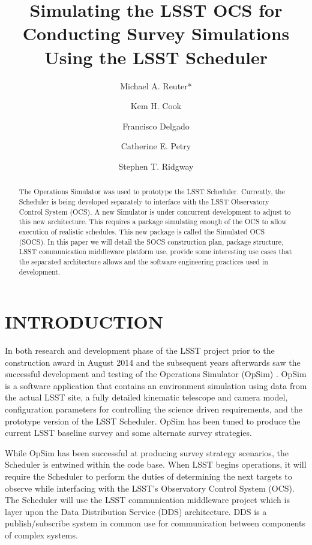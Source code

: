 \documentclass[]{spie}  %
\title{Simulating the LSST OCS for Conducting Survey Simulations Using the LSST Scheduler}
\author[a]{Michael A. Reuter*}
\author[b]{Kem H. Cook}
\author[a]{Francisco Delgado}
\author[a]{Catherine E. Petry}
\author[c]{Stephen T. Ridgway}
\affil[a]{LSST, 950 N Cherry Ave, Tucson, AZ USA}
\affil[b]{Cook Astronomical Consulting, San Ramon, CA USA}
\affil[c]{National Optical Astronomy Observatory, 950 N Cherry Ave, Tucson, AZ USA}
\begin{document}
 
\maketitle

\begin{abstract}
The Operations Simulator was used to prototype the LSST Scheduler. Currently, the Scheduler is being developed separately to interface with the LSST Observatory Control System (OCS). A new Simulator is under concurrent development to adjust to this new architecture. This requires a package simulating enough of the OCS to allow execution of realistic schedules. This new package is called the Simulated OCS (SOCS). In this paper we will detail the SOCS construction plan, package structure, LSST communication middleware platform use, provide some interesting use cases that the separated architecture allows and the software engineering practices used in development.
\end{abstract}


\section{INTRODUCTION}
\label{sec:intro}  %

In both research and development phase of the LSST project prior to the construction award in August 2014 and the subsequent years afterwards saw the successful development and testing of the Operations Simulator (OpSim) \cite{2014SPIE.9149E..0GD}\cite{2014SPIE.9150E..15D}\cite{2013AAS...22124703S}\cite{2010SPIE.7737E..0ZR}\cite{2010AAS...21540105K}\cite{2009AAS...21346004C}\cite{2007AAS...21113703P}\cite{2006SPIE.6270E..1DD}\cite{2006AAS...209.8604P}\cite{2005AAS...207.2626C}\cite{2004AAS...20510809C} . OpSim is a software application that contains an environment simulation using data from the actual LSST site, a fully detailed kinematic telescope and camera model, configuration parameters for controlling the science driven requirements, and the prototype version of the LSST Scheduler. OpSim has been tuned to produce the current LSST baseline survey and some alternate survey strategies\cite{Cook_SPIE2016}. 

While OpSim has been successful at producing survey strategy scenarios, the Scheduler is entwined within the code base. When LSST begins operations, it will require the Scheduler to perform the duties of determining the next targets to observe while interfacing with the LSST's Observatory Control System (OCS)\cite{Daly_SPIE2016}. The Scheduler will use the LSST communication middleware\cite{Mills_SPIE2016} project which is layer upon the Data Distribution Service (DDS) architecture. DDS is a publish/subscribe system in common use for communication between components of complex systems. 
\end{document}
